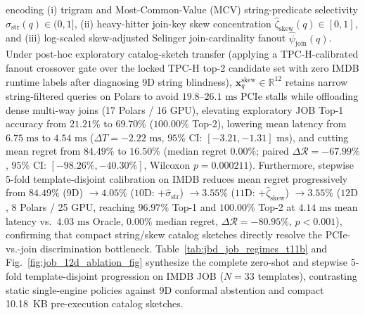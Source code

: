 \documentclass[10pt,a4paper]{article}
\begin{document}
encoding (i) trigram and Most-Common-Value (MCV) string-predicate selectivity $\hat{\sigma}_{\text{str}}(q) \in (0,1]$, (ii) heavy-hitter join-key skew concentration $\hat{\zeta}_{\text{skew}}(q) \in [0,1]$, and (iii) log-scaled skew-adjusted Selinger join-cardinality fanout $\hat{\psi}_{\text{join}}(q)$. Under post-hoc exploratory catalog-sketch transfer (applying a TPC-H-calibrated fanout crossover gate over the locked TPC-H top-2 candidate set with zero IMDB runtime labels after diagnosing 9D string blindness), $\mathbf{x}_q^{\text{skew}} \in \mathbb{R}^{12}$ retains narrow string-filtered queries on Polars to avoid $19.8\text{--}26.1\text{ ms}$ PCIe stalls while offloading dense multi-way joins (17 Polars / 16 GPU), elevating exploratory JOB Top-1 accuracy from $21.21\%$ to $69.70\%$ ($100.00\%$ Top-2), lowering mean latency from $6.75\text{ ms}$ to $4.54\text{ ms}$ ($\Delta T = -2.22\text{ ms}$, $95\%$ CI: $[-3.21, -1.31]\text{ ms}$), and cutting mean regret from $84.49\%$ to $16.50\%$ (median regret $0.00\%$; paired $\Delta\mathcal{R} = -67.99\%$, $95\%$ CI: $[-98.26\%, -40.30\%]$, Wilcoxon $p = 0.000211$). Furthermore, stepwise 5-fold template-disjoint calibration on IMDB reduces mean regret progressively from $84.49\%$ ($9\text{D}$) $\rightarrow 4.05\%$ ($10\text{D}$: $+\hat{\sigma}_{\text{str}}$) $\rightarrow 3.55\%$ ($11\text{D}$: $+\hat{\zeta}_{\text{skew}}$) $\rightarrow 3.55\%$ ($12\text{D}$, 8 Polars / 25 GPU, reaching $96.97\%$ Top-1 and $100.00\%$ Top-2 at $4.14\text{ ms}$ mean latency vs.\ $4.03\text{ ms}$ Oracle, $0.00\%$ median regret, $\Delta\mathcal{R} = -80.95\%$, $p < 0.001$), confirming that compact string/skew catalog sketches directly resolve the PCIe-vs.-join discrimination bottleneck. Table~\ref{tab:jbd_job_regimes_t11b} and Fig.~\ref{fig:job_12d_ablation_fig} synthesize the complete zero-shot and stepwise 5-fold template-disjoint progression on IMDB JOB ($N=33$ templates), contrasting static single-engine policies against 9D conformal abstention and compact 10.18~KB pre-execution catalog sketches.
\end{document}
